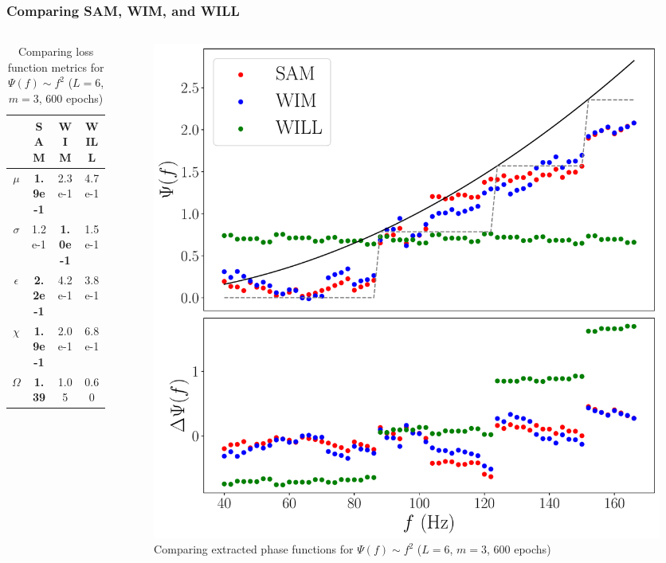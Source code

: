 \documentclass{beamer}
\begin{document}
\begin{frame}
\frametitle{Comparing SAM, WIM, and WILL}
\begin{columns}
\begin{column}{0.5\textwidth}
\begin{table}
\begin{tabular}{c || c| c| c }
& SAM & WIM & WILL \\ \hline \hline 
$\mu$ &  \textbf{1.9e-1} & 2.3e-1 & 4.7e-1 \\
$\sigma$ &  1.2e-1 & \textbf{1.0e-1} & 1.5e-1\\
$\epsilon$  &  \textbf{2.2e-1} & 4.2e-1 & 3.8e-1\\
$\chi$ &  \textbf{1.9e-1} & 2.0e-1 & 6.8e-1 \\ \hline 
$\Omega$ &  \textbf{1.39} & 1.05 & 0.60
\end{tabular}
\caption{Comparing loss function metrics for $\Psi(f) \sim f^2$ ($L=6$, $m=3$, 600 epochs)}
\end{table}
\end{column}
\begin{column}{0.5\textwidth}
\begin{figure}
\centering 
\includegraphics[width=\textwidth]{im/SAM_WIM_WILL_F2}
\caption{Comparing extracted phase functions for $\Psi(f) \sim f^2$ ($L=6$, $m=3$, 600 epochs)}
\end{figure}
\end{column}
\end{columns}
\end{frame}
\end{document}
